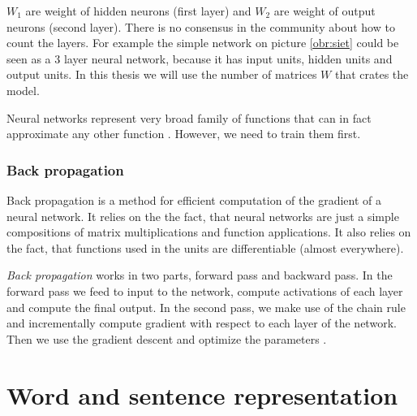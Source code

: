         $W_1$ are weight of hidden neurons (first layer) and $W_2$ are weight of output neurons (second layer).
        There is no consensus in the community about how to count the layers. 
        For example the simple network on picture \ref{obr:siet} could be seen as a $3$ layer neural network,
        because it has input units, hidden units and output units.
        In this thesis we will use the number of matrices $W$ that crates the model.
        
        Neural networks represent very broad family of functions that can in fact approximate any other function \cite{cybenko1989approximation}.
        However, we need to train them first.
        
        \subsubsection{Back propagation}
        
        Back propagation is a method for efficient computation of the gradient of a neural network.
        It relies on the the fact, that neural networks are just a simple compositions of matrix multiplications and function applications. 
        It also relies on the fact, that functions used in the units are differentiable (almost everywhere).
        
        \textit{Back propagation} works in two parts, forward pass and backward pass.
        In the forward pass we feed to input to the network, compute activations of each layer and compute the final output.
        In the second pass, we make use of the chain rule and incrementally compute gradient with respect to each layer of the network.
        Then we use the gradient descent and optimize the parameters \cite{rumelhart1986david}.
        
        \* %
        
    \section{Word and sentence representation}

